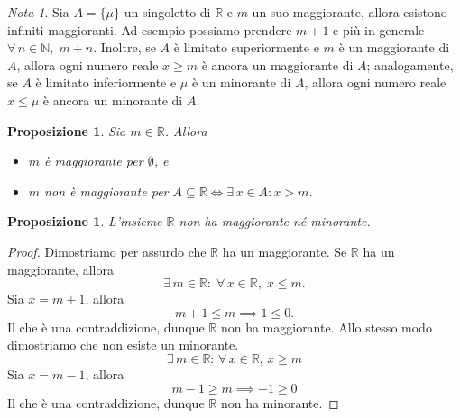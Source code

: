 \documentclass{article}
\theoremstyle{plain}
\newtheorem{prop}[thm]{Proposizione}
\theoremstyle{definition}
\theoremstyle{remark}
\newtheorem{note}{Nota}
\begin{document}
\vspace{10pt}

\begin{note}
    Sia $A=\{\mu\}$ un singoletto di $\mathbb{R}$ e $m$ un suo maggiorante, allora esistono infiniti maggioranti. 
    Ad esempio possiamo prendere $m+1$ e più in generale $\forall\,n\in\mathbb{N},\;m+n$. 
    Inoltre, se $A$ è limitato superiormente e $m$ è un maggiorante di $A$, allora ogni numero reale $x \geq m$ è ancora un maggiorante di $A$; analogamente, se $A$ è limitato inferiormente e $\mu$ è un minorante di $A$, allora ogni numero reale $x \leq \mu$ è ancora un minorante di $A$.
\end{note}

\vspace{10pt}

\begin{bxthm}
\begin{prop}
    Sia $m\in\mathbb{R}$. Allora
    \begin{itemize}
        \item $m$ è maggiorante per $\emptyset$, e
        \item $m$ non è maggiorante per $A\subseteq\mathbb{R} \iff\exists\, x\in A : x>m $.
    \end{itemize}
\end{prop}
\end{bxthm}

\vspace{10pt}

\begin{bxthm}
\begin{prop}
L'insieme $\mathbb{R}$ non ha maggiorante né minorante.
\end{prop}
\end{bxthm}
\begin{proof}
    Dimostriamo per assurdo che $\mathbb{R}$ ha un maggiorante.
    Se $\mathbb{R}$ ha un maggiorante, allora 
    \[\exists\, m\in\mathbb{R}:\;\forall\, x\in\mathbb{R},\; x\leq m.\]
    Sia $x=m+1$, allora \[ m+1\leq m \implies 1\leq0.\]
    Il che è una contraddizione, dunque $\mathbb{R}$ non ha maggiorante.
    Allo stesso modo dimostriamo che non esiste un minorante.
    \[\exists\, m\in\mathbb{R}:\,\forall \,x\in\mathbb{R},\, x\geq m\]
    Sia $x=m-1$, allora 
    \[m-1\geq m\implies -1\geq0\]
    Il che è una contraddizione, dunque $\mathbb{R}$ non ha minorante.
\end{proof}

\vspace{10pt}
\end{document}
